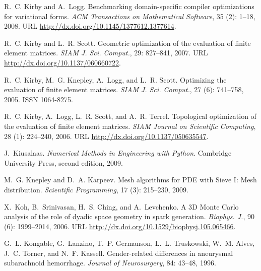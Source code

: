 \begin{thebibliography}{467}
R.~C. Kirby and A.~Logg.
\newblock Benchmarking domain-specific compiler optimizations for variational
  forms.
\newblock \emph{ACM Transactions on Mathematical Software}, 35
  (2): 1--18, 2008.
\newblock URL \url{http://dx.doi.org/10.1145/1377612.1377614}.

R.~C. Kirby and L.~R. Scott.
\newblock Geometric optimization of the evaluation of finite element matrices.
\newblock \emph{SIAM J. Sci. Comput.}, 29: 827--841, 2007.
\newblock URL \url{http://dx.doi.org/10.1137/060660722}.

R.~C. Kirby, M.~G. Knepley, A.~Logg, and L.~R. Scott.
\newblock Optimizing the evaluation of finite element matrices.
\newblock \emph{SIAM J. Sci. Comput.}, 27 (6): 741--758,
  2005.
\newblock ISSN 1064-8275.

R.~C. Kirby, A.~Logg, L.~R. Scott, and A.~R. Terrel.
\newblock Topological optimization of the evaluation of finite element
  matrices.
\newblock \emph{SIAM Journal on Scientific Computing}, 28
  (1): 224--240, 2006.
\newblock URL \url{http://dx.doi.org/10.1137/050635547}.

J.~Kiusalaas.
\newblock \emph{Numerical Methods in Engineering with Python}.
\newblock Cambridge University Press, second edition, 2009.

M.~G. Knepley and D.~A. Karpeev.
\newblock Mesh algorithms for {PDE} with {S}ieve {I}: {M}esh distribution.
\newblock \emph{Scientific Programming}, 17 (3): 215--230,
  2009.

X.~Koh, B.~Srinivasan, H.~S. Ching, and A.~Levchenko.
\newblock A 3{D} {M}onte {C}arlo analysis of the role of dyadic space geometry
  in spark generation.
\newblock \emph{Biophys. J.}, 90 (6): 1999--2014, 2006.
\newblock URL \url{http://dx.doi.org/10.1529/biophysj.105.065466}.

G.~L. Kongable, G.~Lanzino, T.~P. Germanson, L.~L. Truskowski, W.~M. Alves,
  J.~C. Torner, and N.~F. Kassell.
\newblock Gender-related differences in aneurysmal subarachnoid hemorrhage.
\newblock \emph{Journal of Neurosurgery}, 84: 43--48, 1996.


\end{thebibliography}
